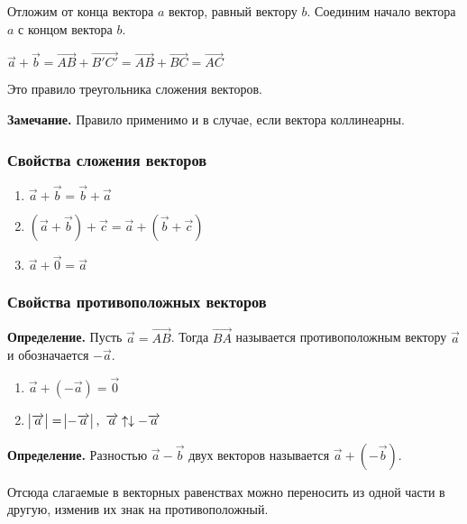 \documentclass{article}
\begin{document}
    Отложим от конца вектора $a$ вектор, равный вектору $b$. Соединим начало вектора $a$ с концом вектора $b$.
    
    \( \overrightarrow{a} + \overrightarrow{b} = \overrightarrow{AB} + \overrightarrow{B'C'} = \overrightarrow{AB} + \overrightarrow{BC} = \overrightarrow{AC} \)

    Это правило треугольника сложения векторов.

    \textbf{Замечание.} Правило применимо и в случае, если вектора коллинеарны.
    
    \subsubsection{Свойства сложения векторов}
    
    \begin{enumerate}
        \item \(\overrightarrow{a} + \overrightarrow{b} = \overrightarrow{b} + \overrightarrow{a}\)
        \item \((\overrightarrow{a} + \overrightarrow{b}) + \overrightarrow{c} = \overrightarrow{a} + (\overrightarrow{b} + \overrightarrow{c})\)
        \item \(\overrightarrow{a} + \overrightarrow{0} = \overrightarrow{a}\)
    \end{enumerate}

    \subsubsection{Свойства противоположных векторов}

    \textbf{Определение.} Пусть \(\overrightarrow{a} = \overrightarrow{AB}\). Тогда \(\overrightarrow{BA}\) называется противоположным вектору \(\overrightarrow{a}\) и обозначается \(-\overrightarrow{a}\).

    \begin{enumerate}
        \item \(\overrightarrow{a} + (-\overrightarrow{a}) = \overrightarrow{0}\)
        \item \(\abs{\overrightarrow{a}}=\abs{-\overrightarrow{a}},\ \overrightarrow{a} \uparrow\downarrow -\overrightarrow{a}\)
    \end{enumerate}

    \textbf{Определение.} Разностью \(\overrightarrow a - \overrightarrow b\) двух векторов называется \(\overrightarrow a + (-\overrightarrow b)\).

    Отсюда слагаемые в векторных равенствах можно переносить из одной части в другую, изменив их знак на противоположный.
\end{document}
